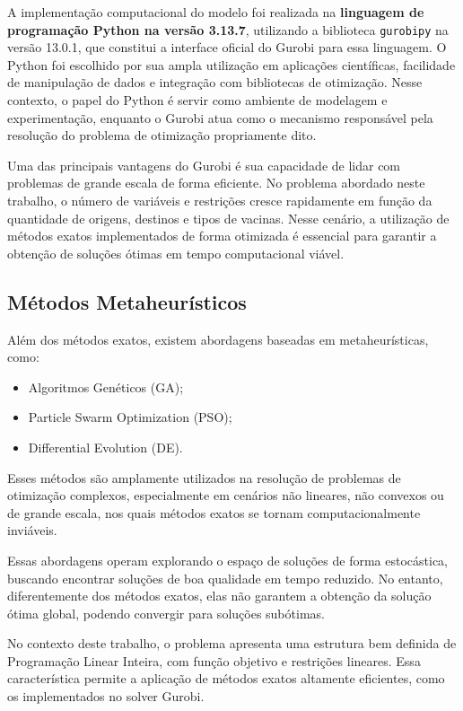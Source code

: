 A implementação computacional do modelo foi realizada na \textbf{linguagem de programação Python na versão 3.13.7}, utilizando a biblioteca \texttt{gurobipy} na versão 13.0.1, que constitui a interface oficial do Gurobi para essa linguagem. O Python foi escolhido por sua ampla utilização em aplicações científicas, facilidade de manipulação de dados e integração com bibliotecas de otimização. Nesse contexto, o papel do Python é servir como ambiente de modelagem e experimentação, enquanto o Gurobi atua como o mecanismo responsável pela resolução do problema de otimização propriamente dito.

Uma das principais vantagens do Gurobi é sua capacidade de lidar com problemas de grande escala de forma eficiente. No problema abordado neste trabalho, o número de variáveis e restrições cresce rapidamente em função da quantidade de origens, destinos e tipos de vacinas. Nesse cenário, a utilização de métodos exatos implementados de forma otimizada é essencial para garantir a obtenção de soluções ótimas em tempo computacional viável.


\subsection{Métodos Metaheurísticos}

Além dos métodos exatos, existem abordagens baseadas em metaheurísticas, como:

\begin{itemize}
\item Algoritmos Genéticos (GA);
\item Particle Swarm Optimization (PSO);
\item Differential Evolution (DE).
\end{itemize}

Esses métodos são amplamente utilizados na resolução de problemas de otimização complexos, especialmente em cenários não lineares, não convexos ou de grande escala, nos quais métodos exatos se tornam computacionalmente inviáveis.

Essas abordagens operam explorando o espaço de soluções de forma estocástica, buscando encontrar soluções de boa qualidade em tempo reduzido. No entanto, diferentemente dos métodos exatos, elas não garantem a obtenção da solução ótima global, podendo convergir para soluções subótimas.

No contexto deste trabalho, o problema apresenta uma estrutura bem definida de Programação Linear Inteira, com função objetivo e restrições lineares. Essa característica permite a aplicação de métodos exatos altamente eficientes, como os implementados no solver Gurobi.

